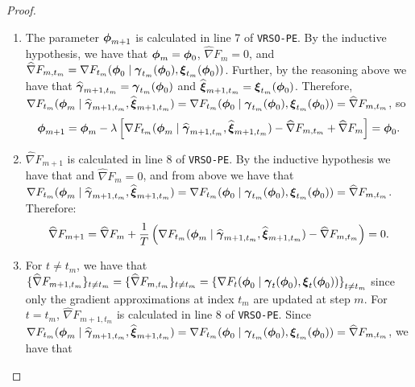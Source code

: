 \begin{proof}
\begin{enumerate}
        \item The parameter $\boldsymbol{\phi}_{m+1}$ is calculated in line 7 of \texttt{VRSO-PE}. By the inductive hypothesis, we have that $\boldsymbol{\phi}_{m} = \boldsymbol{\phi}_{0}$, $\widehat \nabla F_m = 0$, and $\widehat \nabla F_{m,t_m} = \nabla F_{t_m}(\boldsymbol{\phi}_0 \mid \boldsymbol{\gamma}_{t_m}(\boldsymbol{\phi}_0), \boldsymbol{\xi}_{t_m}(\boldsymbol{\phi}_0))$. Further, by the reasoning above we have that $\widehat {\boldsymbol{\gamma}}_{m+1,t_m} = \boldsymbol{\gamma}_{t_m}(\boldsymbol{\phi}_0)$ and $\widehat {\boldsymbol{\xi}}_{m+1,t_m} = \boldsymbol{\xi}_{t_m}(\boldsymbol{\phi}_0)$. Therefore, $\nabla F_{t_m}(\boldsymbol{\phi}_m \mid \widehat {\boldsymbol{\gamma}}_{m+1,t_m}, \widehat {\boldsymbol{\xi}}_{m+1,t_m}) = \nabla F_{t_m}(\boldsymbol{\phi}_0 \mid \boldsymbol{\gamma}_{t_m}(\boldsymbol{\phi}_0), \boldsymbol{\xi}_{t_m}(\boldsymbol{\phi}_0)) = \widehat \nabla F_{m,t_m}$, so
        \begin{equation}
            \boldsymbol{\phi}_{m+1} = \boldsymbol{\phi}_m - \lambda \left[\nabla F_{t_m}(\boldsymbol{\phi}_m \mid \widehat {\boldsymbol{\gamma}}_{m+1,t_m}, \widehat {\boldsymbol{\xi}}_{m+1,t_m}) - \widehat \nabla F_{m,t_m} + \widehat \nabla F_m \right] = \boldsymbol{\phi}_0.
        \end{equation}
        \item $\widehat \nabla F_{m+1}$ is calculated in line 8 of \texttt{VRSO-PE}. By the inductive hypothesis we have that and $\widehat \nabla F_m = 0$, and from above we have that $\nabla F_{t_m}(\boldsymbol{\phi}_m \mid \widehat {\boldsymbol{\gamma}}_{m+1,t_m}, \widehat {\boldsymbol{\xi}}_{m+1,t_m}) = \nabla F_{t_m}(\boldsymbol{\phi}_0 \mid \boldsymbol{\gamma}_{t_m}(\boldsymbol{\phi}_0), \boldsymbol{\xi}_{t_m}(\boldsymbol{\phi}_0)) = \widehat \nabla F_{m,t_m}$. Therefore:
        \begin{equation}
            \widehat \nabla F_{m+1} = \widehat \nabla F_m + \frac{1}{T} \left(\nabla F_{t_m}(\boldsymbol{\phi}_m \mid \widehat {\boldsymbol{\gamma}}_{m+1,t_m}, \widehat {\boldsymbol{\xi}}_{m+1,t_m}) - \widehat \nabla F_{m,t_m}\right) = 0.
        \end{equation}
        \item For $t \neq t_m$, we have that $\{\widehat \nabla F_{m+1,t_m}\}_{t \neq t_m} = \{\widehat \nabla F_{m,t_m}\}_{t \neq t_m} = \left\{\nabla F_t(\boldsymbol{\phi}_0 \mid \boldsymbol{\gamma}_t(\boldsymbol{\phi}_0),\boldsymbol{\xi}_t(\boldsymbol{\phi}_0))\right\}_{t \neq t_m}$ since only the gradient approximations at index $t_m$ are updated at step $m$. For $t = t_m$, $\widehat \nabla F_{m+1,t_m}$ is calculated in line 8 of \texttt{VRSO-PE}. Since $\nabla F_{t_m}(\boldsymbol{\phi}_m \mid \widehat {\boldsymbol{\gamma}}_{m+1,t_m}, \widehat {\boldsymbol{\xi}}_{m+1,t_m}) = \nabla F_{t_m}(\boldsymbol{\phi}_0 \mid \boldsymbol{\gamma}_{t_m}(\boldsymbol{\phi}_0), \boldsymbol{\xi}_{t_m}(\boldsymbol{\phi}_0)) = \widehat \nabla F_{m,t_m}$, we have that

\end{enumerate}
\end{proof}
